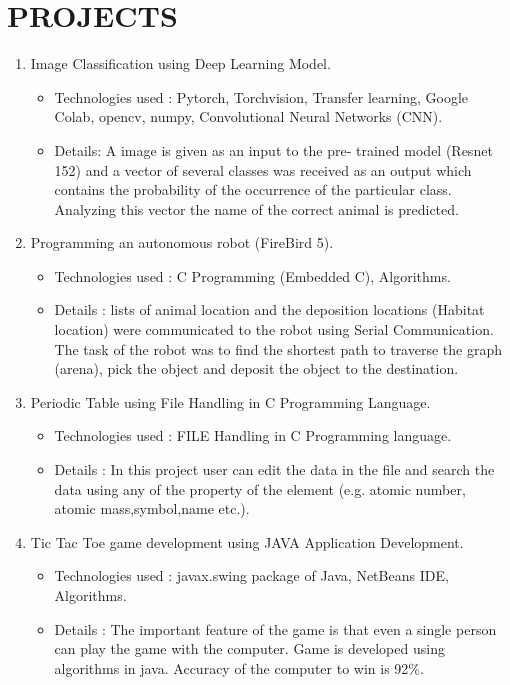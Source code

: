 \documentclass[11pt,a4paper,sans]{moderncv}
\begin{document}
\section{PROJECTS}
\begin{enumerate}
	\item Image Classification using Deep Learning Model.
		\begin{itemize}
			\item Technologies used : Pytorch, Torchvision, Transfer learning, Google Colab, opencv, numpy, Convolutional Neural Networks (CNN).
			\item  Details: A image is given as an input to the pre- trained model (Resnet 152) and a vector of several classes was received as an output which contains the probability of the occurrence of the particular class. Analyzing this vector the name of the correct animal is predicted.
		\end{itemize}

	\item Programming an autonomous robot (FireBird 5).
		\begin{itemize}
			\item Technologies used : C Programming (Embedded C), Algorithms.
			\item Details : lists of animal location and the deposition locations (Habitat location) were communicated to the robot using Serial Communication. The task of the robot was to find the shortest path to traverse the graph (arena), pick the object and deposit the object to the destination.
		\end{itemize}
	\item Periodic Table using File Handling in C Programming Language.
		\begin{itemize}
			\item Technologies used : FILE Handling in C
Programming language.
			\item Details : In this project user can edit the data in the file and search the data using any of the property of the element (e.g. atomic number, atomic mass,symbol,name etc.).
		\end{itemize}
	\item Tic Tac Toe game development using JAVA Application Development.
		\begin{itemize}
			\item Technologies used : javax.swing package of Java, NetBeans IDE, Algorithms.
			\item Details : The important feature of the game is that even a single person can play the game with the computer.
Game is developed using algorithms in java. Accuracy of the computer to win is 92\%.
		\end{itemize}

\end{enumerate}
\end{document}
